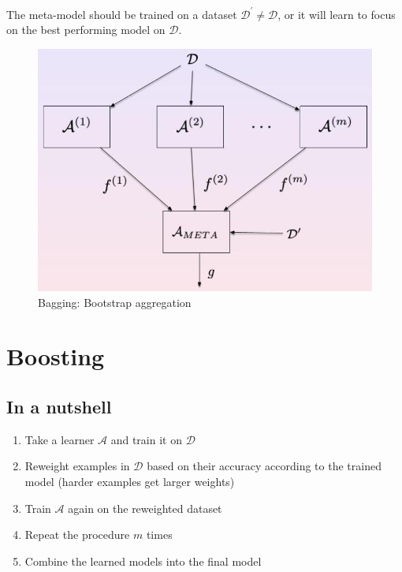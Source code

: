 The meta-model should be trained on a dataset
$\mathcal{D}^{\prime}\neq \mathcal{D}$, or it will learn to focus on the best performing
model on $\mathcal{D}$.

\begin{figure}[H]
	\centering
	\includegraphics[scale=0.4]{
        images/17_EnsembleMethods_stacking.jpg
    }
	\caption{Bagging: Bootstrap aggregation}
\end{figure}

\section{Boosting}

\subsection{In a nutshell}
\begin{enumerate}[]
	\item Take a learner $\mathcal{A}$ and train it on $\mathcal{D}$

	\item Reweight examples in $\mathcal{D}$ based on their accuracy according to the
		trained model (harder examples get larger weights)

	\item Train $\mathcal{A}$ again on the reweighted dataset

	\item Repeat the procedure $m$ times

	\item Combine the learned models into the final model
\end{enumerate}

